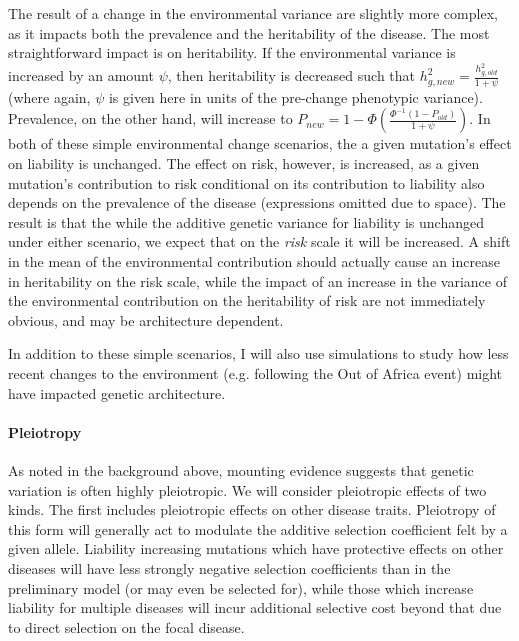 \documentclass[11pt]{article}
\begin{document}
The result of a change in the environmental variance are slightly more complex, as it impacts both the prevalence and the heritability of the disease. The most straightforward impact is on heritability. If the environmental variance is increased by an amount $\psi$, then heritability is decreased such that $h^2_{g,new} = \frac{h^2_{g,old}}{1+\psi}$ (where again, $\psi$ is given here in units of the pre-change phenotypic variance). Prevalence, on the other hand, will increase to $P_{new} = 1 - \Phi\left(\frac{\Phi^{-1}\left(1-P_{old}\right)}{1+\psi}\right)$.
In both of these simple environmental change scenarios, the a given mutation's effect on liability is unchanged. The effect on risk, however, is increased, as a given mutation's contribution to risk conditional on its contribution to liability also depends on the prevalence of the disease (expressions omitted due to space). The result is that the while the additive genetic variance for liability is unchanged under either scenario, we expect that on the \textit{risk} scale it will be increased. A shift in the mean of the environmental contribution should actually cause an increase in heritability on the risk scale, while the impact of an increase in the variance of the environmental contribution on the heritability of risk are not immediately obvious, and may be architecture dependent.

In addition to these simple scenarios, I will also use simulations to study how less recent changes to the environment (e.g. following the Out of Africa event) might have impacted genetic architecture.



\paragraph{Pleiotropy}

As noted in the background above, mounting evidence suggests that genetic variation is often highly pleiotropic. We will consider pleiotropic effects of two kinds. The first includes pleiotropic effects on other disease traits. Pleiotropy of this form will generally act to modulate the additive selection coefficient felt by a given allele. Liability increasing mutations which have protective effects on other diseases will have less strongly negative selection coefficients than in the preliminary model (or may even be selected for), while those which increase liability for multiple diseases will incur additional selective cost beyond that due to direct selection on the focal disease.
\end{document}
